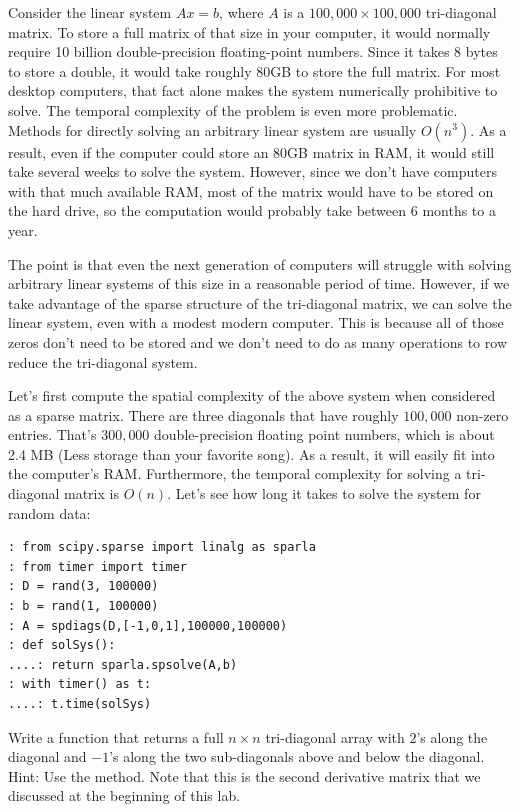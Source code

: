 Consider the linear system $A x = b$, where $A$ is a
 $100,\!000\times 100,\!000$ tri-diagonal matrix.  To store a full
matrix of that size in your computer, it would normally require 10
billion double-precision floating-point numbers.  Since it takes 8
bytes to store a double, it would take roughly 80GB to store the
full matrix.  For most desktop computers, that fact alone makes the
system numerically prohibitive to solve. The temporal complexity of the problem is even more problematic. Methods for directly solving an arbitrary linear system are usually $O(n^3)$.  As
a result, even if the computer could store an 80GB matrix in RAM, it
would still take several weeks to solve the system.  However, since
we don't have computers with that much available RAM, most of the
matrix would have to be stored on the hard drive, so the computation
would probably take between $6$ months to a year.

The point is that even the next generation of computers will
struggle with solving arbitrary linear systems of this size in a
reasonable period of time.  However, if we take advantage of the
sparse structure of the tri-diagonal matrix, we can solve the linear
system, even with a modest modern computer.  This is because all of
those zeros don't need to be stored and we don't need to do as many
operations to row reduce the tri-diagonal system.

Let's first compute the spatial complexity of the above system when
considered as a sparse matrix.  There are three diagonals that have
roughly $100,\!000$ non-zero entries.  That's $300,\!000$
double-precision floating point numbers, which is about 2.4 MB (Less
storage than your favorite song).  As a result, it will easily
fit into the computer's RAM.  Furthermore, the temporal complexity for solving
a tri-diagonal matrix is $O(n)$. Let's see how long it takes to
solve the system for random data:

\begin{lstlisting}[style=python]
: from scipy.sparse import linalg as sparla
: from timer import timer
: D = rand(3, 100000)
: b = rand(1, 100000)
: A = spdiags(D,[-1,0,1],100000,100000)
: def solSys():
....: return sparla.spsolve(A,b)
: with timer() as t:
....: t.time(solSys)
\end{lstlisting}

\begin{problem}
Write a function that returns a full $n\times n$
tri-diagonal array with $2$'s along the diagonal and $-1$'s along
the two sub-diagonals above and below the diagonal. Hint: Use the  method. Note that this is the second derivative matrix that we discussed at the beginning of this lab.
\end{problem}

